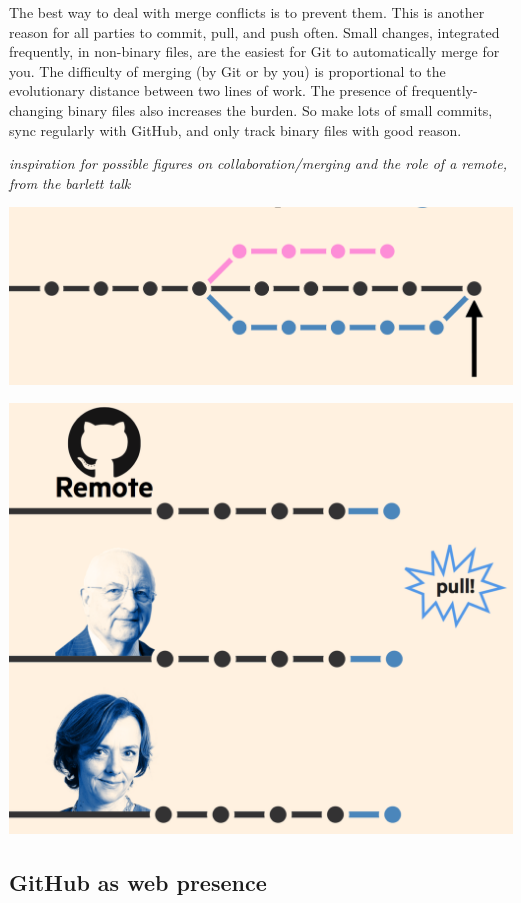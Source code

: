 \documentclass[12pt]{article}
\begin{document}
The best way to deal with merge conflicts is to prevent them. This is
another reason for all parties to commit, pull, and push often. Small
changes, integrated frequently, in non-binary files, are the easiest for
Git to automatically merge for you. The difficulty of merging (by Git or
by you) is proportional to the evolutionary distance between two lines
of work. The presence of frequently-changing binary files also increases
the burden. So make lots of small commits, sync regularly with GitHub,
and only track binary files with good reason.

\emph{inspiration for possible figures on collaboration/merging and the
role of a remote, from the barlett talk}

\includegraphics[width=1\linewidth]{bartlett-merge-commit}

\includegraphics[width=1\linewidth]{bartlett-pull}

\subsection{GitHub as web presence}\label{github-as-web-presence}
\end{document}
